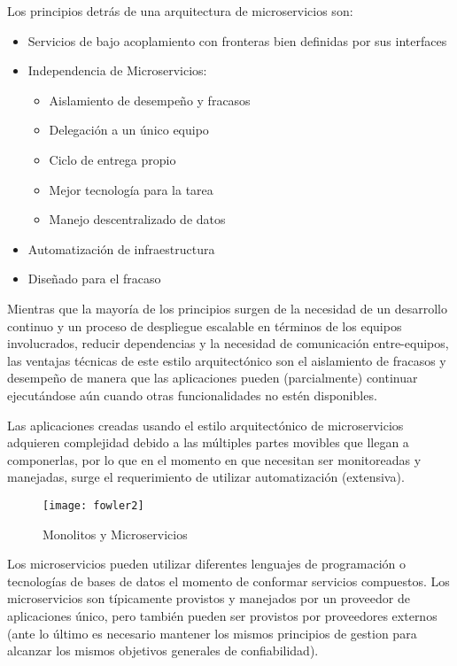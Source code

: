         {Los principios detrás de una arquitectura de microservicios son:}
        
        \begin{itemize}
            \item {Servicios de bajo acoplamiento con fronteras bien definidas por sus
              interfaces}
            \item {Independencia de Microservicios:}
                \begin{itemize}
                \item {Aislamiento de desempeño y fracasos}
                \item {Delegación a un único equipo}
                \item {Ciclo de entrega propio}
                \item {Mejor tecnología para la tarea}
                \item {Manejo descentralizado de datos }
                \end{itemize}
            \item {Automatización de infraestructura}
            \item {Diseñado para el fracaso}
        \end{itemize} 
        Mientras que la mayoría de los principios surgen de la necesidad de un desarrollo continuo y un proceso de despliegue escalable en términos de los equipos involucrados, reducir dependencias y la necesidad de comunicación entre-equipos, las ventajas técnicas de este estilo arquitectónico son el aislamiento de fracasos y desempeño de manera que las aplicaciones pueden (parcialmente) continuar ejecutándose aún cuando otras funcionalidades no estén disponibles. 
        
        Las aplicaciones creadas usando el estilo arquitectónico de microservicios adquieren complejidad debido a las múltiples partes movibles que llegan a componerlas, por lo que en el momento en que necesitan ser monitoreadas y manejadas, surge el requerimiento de utilizar automatización (extensiva).
        \begin{figure}[H]
            \centering
            \texttt{[image: fowler2]}
            \caption{Monolitos y Microservicios \protect\cite{Lewis2016-az}}
            \label{fig:fowler2}
        \end{figure}

        Los microservicios pueden utilizar diferentes lenguajes de programación o tecnologías de bases de datos el momento de conformar servicios compuestos. Los microservicios son típicamente provistos y manejados por un proveedor de aplicaciones único, pero también pueden ser provistos por proveedores externos (ante lo último es necesario mantener los mismos principios de gestion para alcanzar los mismos objetivos generales de confiabilidad).
        
